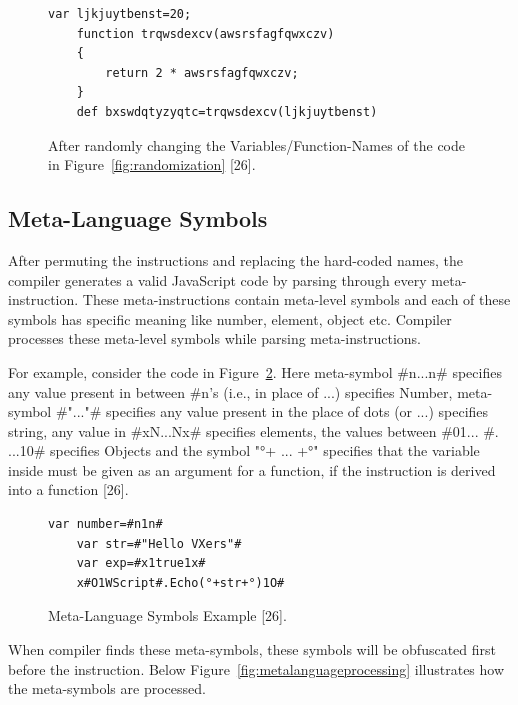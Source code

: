 \begin{figure}
  \centering
  \begin{lstlisting}[language=myasm]
	var ljkjuytbenst=20;
	function trqwsdexcv(awsrsfagfqwxczv) 
	{ 
		return 2 * awsrsfagfqwxczv; 
	}
	def bxswdqtyzyqtc=trqwsdexcv(ljkjuytbenst)
\end{lstlisting}
    \caption[After Variable/Function-Name randomization]{After randomly changing the Variables/Function-Names of the code in Figure~\ref{fig:randomization} [26].}
    \label{fig:afterrandomization}
\end{figure}

\subsection{Meta-Language Symbols}

After permuting the instructions and replacing the hard-coded names, the compiler generates a valid JavaScript code by parsing through every meta-instruction. These meta-instructions contain meta-level symbols and each of these symbols has specific meaning like number, element, object etc. Compiler processes these meta-level symbols while parsing meta-instructions. 

For example, consider the code in Figure~\ref{fig:metalanguage}. Here meta-symbol \#n...n\# specifies any value present in between \#n's (i.e., in place of ...) specifies Number, meta-symbol \#"..."\# specifies any value present in the place of dots (or ...) specifies string, any value in \#xN...Nx\# specifies elements, the values between \#01... \#. ...10\# specifies Objects and the symbol "°+ ... +°" specifies that the variable inside must be given as an argument for a function, if the instruction is derived into a function [26].

\begin{figure}
  \centering
  \begin{lstlisting}[language=myasm]
	var number=#n1n#					
	var str=#"Hello VXers"#				
	var exp=#x1true1x#					
	x#O1WScript#.Echo(°+str+°)1O#
\end{lstlisting}
    \caption[Meta-Language Symbols Example]{Meta-Language Symbols Example [26].}
    \label{fig:metalanguage}
\end{figure}

When compiler finds these meta-symbols, these symbols will be obfuscated first before the instruction. Below Figure~\ref{fig:metalanguageprocessing} illustrates how the meta-symbols are processed.

